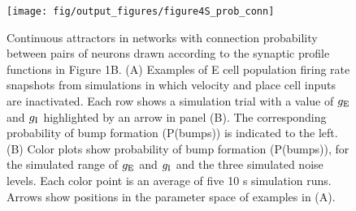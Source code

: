 \documentclass[a4paper,12pt]{article}
\newcommand{\ssc}[3]{\ensuremath{#1_{\text{#2}_{\text{#3}}}}}
\newcommand{\gE      }{\ssc{g}      {\scriptsize{E}}{}}
\newcommand{\gI      }{\ssc{g}      {\scriptsize{I}}{}}
\begin{document}
\clearpage

%
%
%

\setcounter{figure}{0}
\renewcommand{\figurename}{Figure 4 - figure supplement}

\begin{figure}[p]
    \internallinenumbers
    \centering
        \texttt{[image: fig/output\_figures/figure4S\_prob\_conn]}
    \caption{Continuous attractors in networks with connection probability
    between pairs of neurons drawn according to the synaptic profile functions
    in Figure 1B. (A) Examples of E cell population firing rate snapshots from
    simulations in which velocity and place cell inputs are inactivated. Each
    row shows a simulation trial with a value of $\gE$ and $\gI$ highlighted by an
    arrow in panel (B). The corresponding probability of bump formation
    (P(bumps)) is indicated to the left.  (B) Color plots show probability of
    bump formation (P(bumps)), for the simulated range of $\gE$ and $\gI$ and the
    three simulated noise levels. Each color point is an average of five 10 s
    simulation runs. Arrows show positions in the parameter space of examples
    in (A).}
\end{figure}
\end{document}

